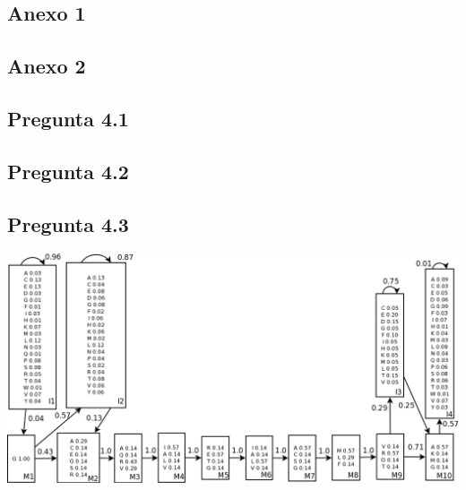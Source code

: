 \subsection{Anexo 1}
\label{sec:anexo1}
\begin{small}
	
\end{small}

\subsection{Anexo 2}
\label{sec:anexo2}
\begin{small}
	
\end{small}

\subsection{Pregunta 4.1}
\label{sec:anexo2}
\begin{small}
	
\end{small}

\subsection{Pregunta 4.2}
\label{sec:anexo2}
\begin{small}
	
\end{small}

\subsection{Pregunta 4.3}
\label{sec:anexo2}
\includegraphics[angle=270,scale=0.55]{img/hmm}

